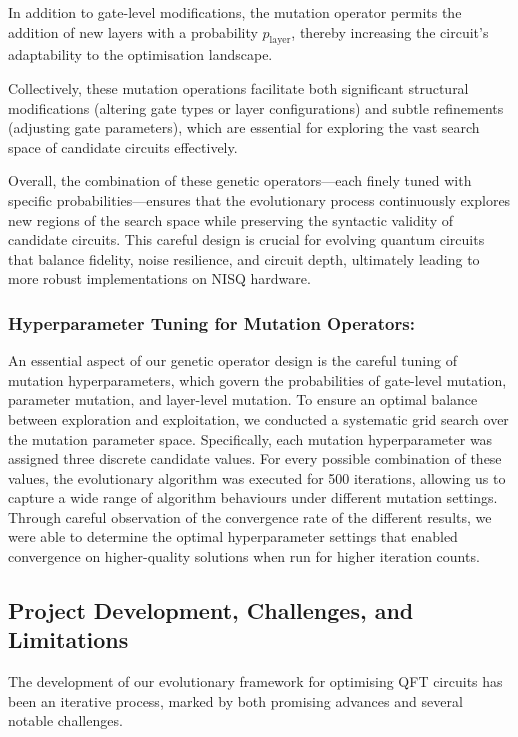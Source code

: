 \documentclass[11pt,a4paper]{article}
\begin{document}
In addition to gate-level modifications, the mutation operator permits the addition of new layers with a probability $p_{\text{layer}}$, thereby increasing the circuit's adaptability to the optimisation landscape.\newline

Collectively, these mutation operations facilitate both significant structural modifications (altering gate types or layer configurations) and subtle refinements (adjusting gate parameters), which are essential for exploring the vast search space of candidate circuits effectively.\newline

Overall, the combination of these genetic operators—each finely tuned with specific probabilities—ensures that the evolutionary process continuously explores new regions of the search space while preserving the syntactic validity of candidate circuits. This careful design is crucial for evolving quantum circuits that balance fidelity, noise resilience, and circuit depth, ultimately leading to more robust implementations on NISQ hardware.

\subsubsection*{Hyperparameter Tuning for Mutation Operators:}
An essential aspect of our genetic operator design is the careful tuning of mutation hyperparameters, which govern the probabilities of gate-level mutation, parameter mutation, and layer-level mutation. To ensure an optimal balance between exploration and exploitation, we conducted a systematic grid search over the mutation parameter space. Specifically, each mutation hyperparameter was assigned three discrete candidate values. For every possible combination of these values, the evolutionary algorithm was executed for 500 iterations, allowing us to capture a wide range of algorithm behaviours under different mutation settings. Through careful observation of the convergence rate of the different results, we were able to determine the optimal hyperparameter settings that enabled convergence on higher-quality solutions when run for higher iteration counts.

\subsection{Project Development, Challenges, and Limitations}
The development of our evolutionary framework for optimising QFT circuits has been an iterative process, marked by both promising advances and several notable challenges.
\end{document}
